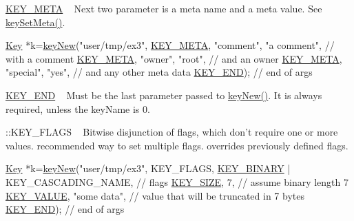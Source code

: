 \begin{DoxyItemize}
\item \hyperlink{group__key_gga91fb3178848bd682000958089abbaf40a040582834bb2d90049947d7ef74e87e2}{K\+E\+Y\+\_\+\+M\+E\+T\+A} ~\newline
 Next two parameter is a meta name and a meta value. See \hyperlink{group__keymeta_gae1f15546b234ffb6007d8a31178652b9}{key\+Set\+Meta()}. 
\begin{DoxyCodeInclude}
\hyperlink{classkdb_1_1Key_a5679f5cae63caddd64a60388b9cc77fa}{Key} *k=\hyperlink{group__key_gad23c65b44bf48d773759e1f9a4d43b89}{keyNew}(\textcolor{stringliteral}{"user/tmp/ex3"},
        \hyperlink{group__key_gga91fb3178848bd682000958089abbaf40a040582834bb2d90049947d7ef74e87e2}{KEY\_META}, \textcolor{stringliteral}{"comment"}, \textcolor{stringliteral}{"a comment"},  \textcolor{comment}{// with a comment}
        \hyperlink{group__key_gga91fb3178848bd682000958089abbaf40a040582834bb2d90049947d7ef74e87e2}{KEY\_META}, \textcolor{stringliteral}{"owner"}, \textcolor{stringliteral}{"root"},         \textcolor{comment}{// and an owner}
        \hyperlink{group__key_gga91fb3178848bd682000958089abbaf40a040582834bb2d90049947d7ef74e87e2}{KEY\_META}, \textcolor{stringliteral}{"special"}, \textcolor{stringliteral}{"yes"},        \textcolor{comment}{// and any other meta data}
        \hyperlink{group__key_gga91fb3178848bd682000958089abbaf40aa8adb6fcb92dec58fb19410eacfdd403}{KEY\_END});                  \textcolor{comment}{// end of args}
\end{DoxyCodeInclude}

\item \hyperlink{group__key_gga91fb3178848bd682000958089abbaf40aa8adb6fcb92dec58fb19410eacfdd403}{K\+E\+Y\+\_\+\+E\+N\+D} ~\newline
 Must be the last parameter passed to \hyperlink{group__key_gad23c65b44bf48d773759e1f9a4d43b89}{key\+New()}. It is always required, unless the {\ttfamily key\+Name} is 0.
\item \+::\+K\+E\+Y\+\_\+\+F\+L\+A\+G\+S ~\newline
 Bitwise disjunction of flags, which don't require one or more values. recommended way to set multiple flags. overrides previously defined flags. 
\begin{DoxyCodeInclude}
\hyperlink{classkdb_1_1Key_a5679f5cae63caddd64a60388b9cc77fa}{Key} *k=\hyperlink{group__key_gad23c65b44bf48d773759e1f9a4d43b89}{keyNew}(\textcolor{stringliteral}{"user/tmp/ex3"},
        KEY\_FLAGS, \hyperlink{group__key_gga91fb3178848bd682000958089abbaf40a1ca18d4e094ae7487d35ecedda2235ff}{KEY\_BINARY} | KEY\_CASCADING\_NAME, \textcolor{comment}{// flags}
        \hyperlink{group__key_gga91fb3178848bd682000958089abbaf40a6d531b5c41445d19d0452eebdccbfa01}{KEY\_SIZE}, 7,                    \textcolor{comment}{// assume binary length 7}
        \hyperlink{group__key_gga91fb3178848bd682000958089abbaf40ac66e4a49d09212b79f5754ca6db5bd2e}{KEY\_VALUE}, \textcolor{stringliteral}{"some data"},                \textcolor{comment}{// value that will be truncated in 7 bytes}
        \hyperlink{group__key_gga91fb3178848bd682000958089abbaf40aa8adb6fcb92dec58fb19410eacfdd403}{KEY\_END});                        \textcolor{comment}{// end of args}
\end{DoxyCodeInclude}


\end{DoxyItemize}

